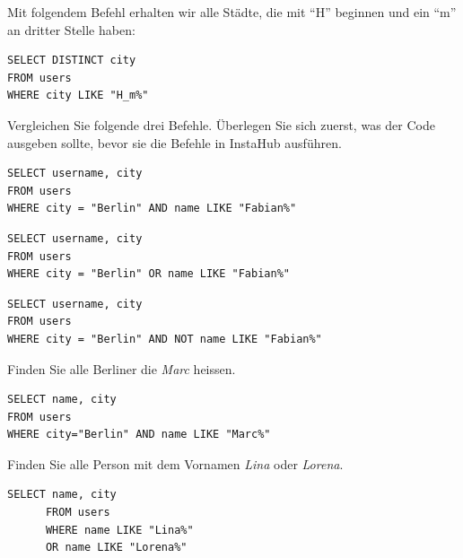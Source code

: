 \begin{myexample}
Mit folgendem Befehl erhalten wir alle Städte, die mit ``H'' beginnen und ein ``m'' an dritter Stelle haben:

\begin{lstlisting}[style=sql]
SELECT DISTINCT city 
FROM users 
WHERE city LIKE "H_m%"
\end{lstlisting}
\end{myexample}



\begin{myexercise}
  Vergleichen Sie folgende drei Befehle. Überlegen Sie sich zuerst, was der Code ausgeben sollte, bevor sie die Befehle in InstaHub ausführen.

  \begin{lstlisting}[style=sql]
SELECT username, city 
FROM users 
WHERE city = "Berlin" AND name LIKE "Fabian%"
\end{lstlisting}

  \begin{lstlisting}[style=sql]
SELECT username, city 
FROM users 
WHERE city = "Berlin" OR name LIKE "Fabian%"
\end{lstlisting}

  \begin{lstlisting}[style=sql]
SELECT username, city 
FROM users 
WHERE city = "Berlin" AND NOT name LIKE "Fabian%"
\end{lstlisting}
\end{myexercise}

\begin{myexercise}
  Finden Sie alle Berliner die \textit{Marc} heissen.
  \begin{myanswer}
    \begin{lstlisting}[style=sql]
SELECT name, city
FROM users
WHERE city="Berlin" AND name LIKE "Marc%"
\end{lstlisting}
  \end{myanswer}
\end{myexercise}

\begin{myexercise}
  Finden Sie alle Person mit dem Vornamen \textit{Lina} oder \textit{Lorena}.
  \begin{myanswer}
    \begin{lstlisting}[style=sql]
      SELECT name, city
      FROM users
      WHERE name LIKE "Lina%"
      OR name LIKE "Lorena%"
    \end{lstlisting}
  \end{myanswer}
\end{myexercise}

